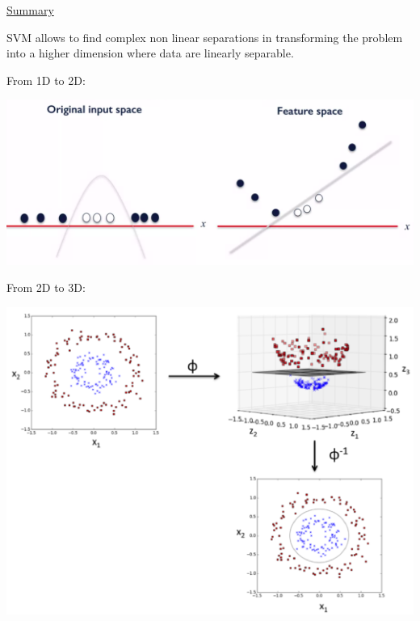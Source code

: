 \vspace{5mm}

\underline{Summary}

\vspace{5mm}

SVM allows to find complex non linear separations in transforming the problem into a higher dimension where data are linearly separable.

\vspace{5mm}

From 1D to 2D:

\begin{center}
\includegraphics[scale=0.15]{kernel_2D.png}
\end{center}

\vspace{5mm}

From 2D to 3D:

\begin{center}
\includegraphics[scale=0.5]{kernel_3D.png}
\end{center}

\vspace{5mm}